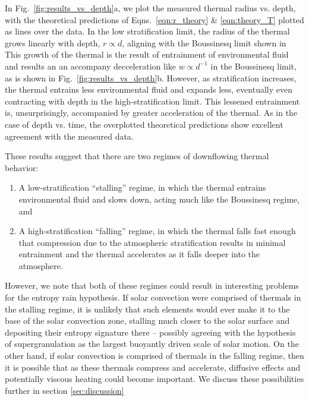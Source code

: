 \documentclass[twocolumn, amsmath, amsfonts, amssymb, trackchanges]{aastex62}
\begin{document}
In Fig.~\ref{fig:results_vs_depth}a, we plot the measured thermal radius vs. depth, with the
theoretical predictions of Eqns.~\ref{eqn:r_theory} \& \ref{eqn:theory_T} plotted as lines
over the data. In the low stratification limit, the radius of the thermal grows linearly with
depth, $r \propto d$, aligning with the Boussinesq limit shown in \citet{lecoanet&jeevanjee2018} 
This growth of the thermal is the result of entrainment of environmental fluid and
results an an accompany decceleration like $w \propto d^{-1}$ in the Boussinesq limit, 
as is shown in Fig.~\ref{fig:results_vs_depth}b.
However, as stratification increases, the thermal entrains less environmental fluid and
expands less, eventually even contracting with depth in the high-stratification limit. 
This lessened entrainment is, unsurprisingly, accompanied by greater acceleration of the thermal.
As in the case of depth vs. time, the overplotted theoretical predictions show excellent
agreement with the measured data.

These results suggest that there are two regimes of downflowing thermal behavior:
\begin{enumerate}
\item A low-stratification ``stalling'' regime, in which the thermal entrains environmental
fluid and slows down, acting much like the Boussinesq regime, and
\item A high-stratification ``falling'' regime, in which the thermal falls fast enough
that compression due to the atmospheric stratification results in minimal entrainment and
the thermal accelerates as it falls deeper into the atmosphere.
\end{enumerate}
However, we note that both of these regimes could result in interesting problems for the
entropy rain hypothesis. If solar convection were comprised of thermals in the stalling regime,
it is unlikely that such elements would ever make it to the base of the solar convection zone, 
stalling much closer to the solar surface and depositing their entropy signature there -- possibly
agreeing with the hypothesis of supergranulation as the largest buoyantly driven scale of
solar motion. On the other hand, if solar convection is comprised of thermals in the falling
regime, then it is possible that as these thermals compress and accelerate, diffusive effects
and potentially viscous heating could become important. We discuss these possibilities further
in section \ref{sec:discussion}
\end{document}
